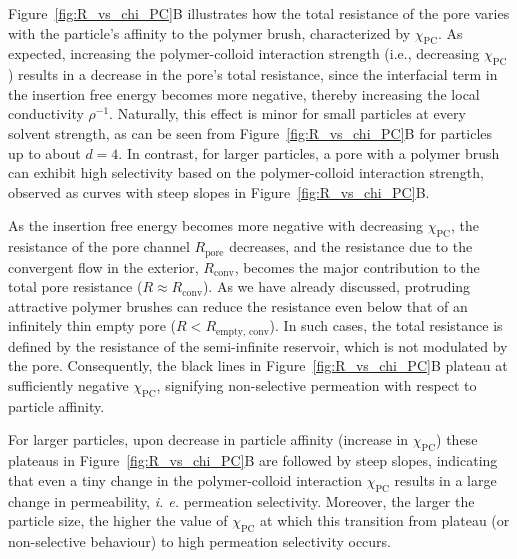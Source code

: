 \documentclass[12pt, a4paper]{article}
\begin{document}
Figure~\ref{fig:R_vs_chi_PC}B illustrates how the total resistance of the pore varies with the particle's affinity to the polymer brush, characterized by $\chi_{\textrm{PC}}$.
As expected, increasing the polymer-colloid interaction strength (i.e., decreasing $\chi_{\textrm{PC}}$) results in a decrease in the pore's total resistance, since the interfacial term in the insertion free energy becomes more negative, thereby increasing the local conductivity $\rho^{-1}$.
Naturally, this effect is minor for small particles at every solvent strength, as can be seen from Figure~\ref{fig:R_vs_chi_PC}B for particles up to about $d = 4$.
In contrast, for larger particles, a pore with a polymer brush can exhibit high selectivity based on the polymer-colloid interaction strength, observed as curves with steep slopes in Figure~\ref{fig:R_vs_chi_PC}B.

As the insertion free energy becomes more negative with decreasing $\chi_{\textrm{PC}}$, the resistance of the pore channel $R_{\textrm{pore}}$ decreases, and the resistance due to the convergent flow in the exterior, $R_{\textrm{conv}}$, becomes the major contribution to the total pore resistance ($R \approx R_{\textrm{conv}}$).
As we have already discussed, protruding attractive polymer brushes can reduce the resistance even below that of an infinitely thin empty pore ($R < R_{\textrm{empty, conv}}$).
In such cases, the total resistance is defined by the resistance of the semi-infinite reservoir, which is not modulated by the pore.
Consequently, the black lines in Figure~\ref{fig:R_vs_chi_PC}B plateau at sufficiently negative $\chi_{\textrm{PC}}$, signifying non-selective permeation with respect to particle affinity.

For larger particles, upon decrease in particle affinity (increase in $\chi_{\textrm{PC}}$) these plateaus in Figure~\ref{fig:R_vs_chi_PC}B are followed by steep slopes, indicating that even a tiny change in the polymer-colloid interaction $\chi_{\textrm{PC}}$ results in a large change in permeability, \emph{i. e.} permeation selectivity.
Moreover, the larger the particle size, the higher the value of $\chi_{\textrm{PC}}$ at which this transition from plateau (or non-selective behaviour) to high permeation selectivity occurs.
\end{document}
